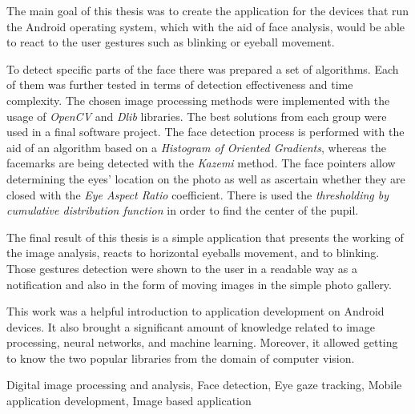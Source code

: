  \newpage
 \abstract

The main goal of this thesis was to create the application for the devices that run the Android operating system, which with the aid of face analysis, would be able to react to the user gestures such as blinking or eyeball movement.

\par

To detect specific parts of the face there was prepared a set of algorithms. Each of them was further tested in terms of detection effectiveness and time complexity. The chosen image processing methods were implemented with the usage of \textit{OpenCV} and \textit{Dlib} libraries. The best solutions from each group were used in a final software project. The face detection process is performed with the aid of an algorithm based on a \textit{Histogram of Oriented Gradients}, whereas the facemarks are being detected with the \textit{Kazemi} method. The face pointers allow determining the eyes' location on the photo as well as ascertain whether they are closed with the \textit{Eye Aspect Ratio} coefficient. There is used the \textit{thresholding by cumulative distribution function} in order to find the center of the pupil.

\par

The final result of this thesis is a simple application that presents the working of the image analysis, reacts to horizontal eyeballs movement, and to blinking. Those gestures detection were shown to the user in a readable way as a notification and also in the form of moving images in the simple photo gallery.

\par

This work was a helpful introduction to application development on Android devices. It also brought a significant amount of knowledge related to image processing, neural networks, and machine learning. Moreover, it allowed getting to know the two popular libraries from the domain of computer vision.


 \keywords Digital image processing and analysis, Face detection, Eye gaze tracking, Mobile application development, Image based application